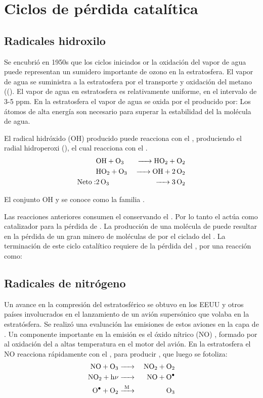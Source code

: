 \section{Ciclos de pérdida catalítica}

\subsection{Radicales hidroxilo}

Se encubrió en 1950s que los ciclos iniciados or la oxidación del vapor de agua puede representan un sumidero importante de ozono en la estratosfera. El vapor de agua se suministra a la estratosfera por el transporte y oxidación del metano ((). El vapor de agua en estratosfera es relativamente uniforme, en el intervalo de 3-5 ppm. En la estratosfera el vapor de agua se oxida por el  producido por:
Los átomos de alta energía  son necesario para superar la estabilidad del la molécula de agua.

El radical hidróxido (OH)  producido puede reacciona con el , produciendo el radial hidroperoxi (), el cual reacciona con el .
\begin{eqnarray*}
& \ce{OH + O3    & -> HO2 + O2 \\
      & HO2 +  O3   &-> OH + 2O2} \\
\mathrm{Neto: } &  \ce{2O3   &  ->  3O2}
\end{eqnarray*}

El conjunto OH y  se conoce como la familia .

Las reacciones anteriores consumen el  conservando el . Por lo tanto el  actúa como catalizador para la pérdida de . La producción de una molécula de  puede resultar en la pérdida de un gran minero de moléculas de  por el ciclado del . La terminación de este ciclo catalítico requiere de la pérdida del , por una reacción como:

\subsection{Radicales de nitrógeno}
Un avance en la compresión del    estratosférico se obtuvo en los EEUU y otros países involucrados en el lanzamiento de un avión supersónico que volaba en la estratósfera.  Se realizó una evaluación las emisiones de estos aviones en la capa de .  Un componente importante en la emisión es el óxido nítrico (NO) , formado por al oxidación del  a altas temperatura en el motor del avión. En la estratosfera el NO reacciona rápidamente con el , para producir   , que luego se fotoliza:
\begin{eqnarray*}
 \ce{NO + O3       & -> &NO2 + O2 \\
  NO2 +  h$\nu$  &  -> &NO + O^. \\
   O^. + O2          &  ->[M] & O3}
\end{eqnarray*}


